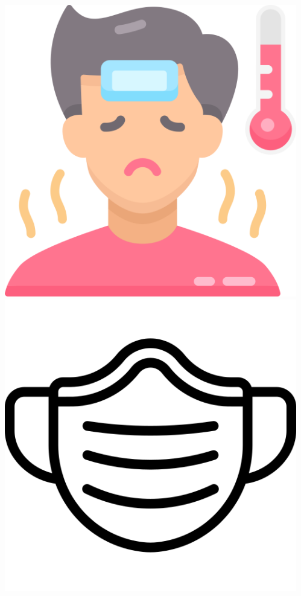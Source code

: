 \documentclass{beamer}
\begin{document}
\begin{CJK*}{UTF8}{bsmi}
\begin{frame}
\begin{columns}
\begin{column}{0.30\textwidth}
            \end{column}
            \begin{column}{0.30\textwidth}
                \centering
                \includegraphics[height=0.3\textheight]{sick.png}\\
                \includegraphics[width=\textwidth, height=0.3\textheight]{mask.png}\\

\end{column}
\end{columns}
\end{frame}
\end{CJK*}
\end{document}
